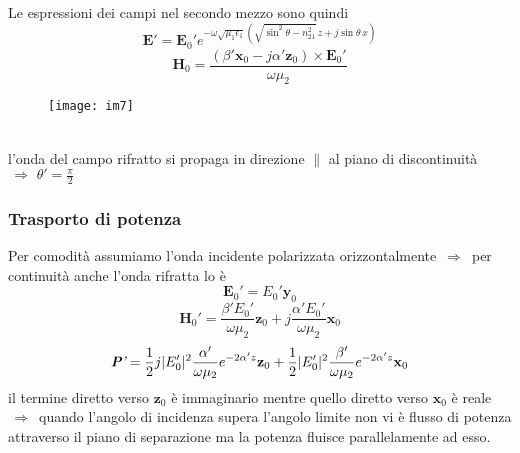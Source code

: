 \documentclass[a4paper]{article}
\begin{document}
Le espressioni dei campi nel secondo mezzo sono quindi
\begin{equation*}
\textbf{E}'=\textbf{E}_0'e^{-\omega\sqrt{\mu_1\epsilon_1}\left(\sqrt{\sin^2\theta-n_{21}^2}\,z+j\sin\theta\,x\right)}
\end{equation*}
\begin{equation*}
\textbf{H}_0=\frac{(\beta'\textbf{x}_0-j\alpha'\textbf{z}_0)\times\textbf{E}_0'}{\omega\mu_2}
\end{equation*}
\begin{figure}[ht] 
\centering
\texttt{[image: im7]}
\end{figure}
\\l'onda del campo rifratto si propaga in direzione $\parallel$ al piano di discontinuità $\,\Rightarrow\,\,\theta'=\frac{\pi}{2}$
\subsubsection*{Trasporto di potenza}
Per comodità assumiamo l'onda incidente polarizzata orizzontalmente $\,\Rightarrow\,$ per continuità anche l'onda rifratta lo è
\begin{equation*}
\textbf{E}_0'=E_0'\textbf{y}_0
\end{equation*}
\begin{equation*}
\textbf{H}_0'=\frac{\beta'E_0'}{\omega\mu_2}\textbf{z}_0+j\frac{\alpha'E_0'}{\omega\mu_2}\textbf{x}_0
\end{equation*}
\begin{equation*}
\emph{\textbf{P}'}=\frac{1}{2}j|E_0'|^2\frac{\alpha'}{\omega\mu_2}e^{-2\alpha'z}\textbf{z}_0+\frac{1}{2}|E_0'|^2\frac{\beta'}{\omega\mu_2}e^{-2\alpha'z}\textbf{x}_0
\end{equation*}
il termine diretto verso $\textbf{z}_0$ è immaginario mentre quello diretto verso $\textbf{x}_0$ è reale $\,\Rightarrow\,$ quando l'angolo di incidenza supera l'angolo limite non vi è flusso di potenza attraverso il piano di separazione ma la potenza fluisce parallelamente ad esso.
\end{document}

